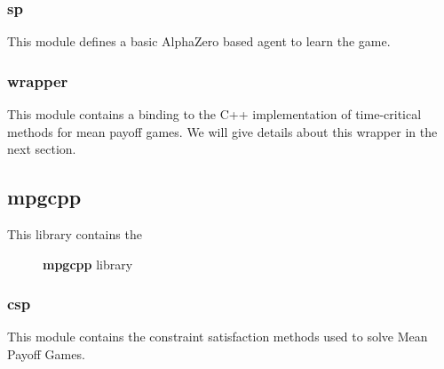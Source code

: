 \subsubsection{sp}
This module defines a basic AlphaZero based agent to learn the game.
\subsubsection{wrapper}
This module contains a binding to the C++ implementation of time-critical methods for mean payoff games.
\newline We will give details about this wrapper in the next section.
\subsection{mpgcpp}
This library contains the 
\begin{figure}[H]
	\centering
	\caption{\textbf{mpgcpp} library}
\end{figure}
\subsubsection{csp}
This module contains the constraint satisfaction methods used to solve Mean Payoff Games. 

